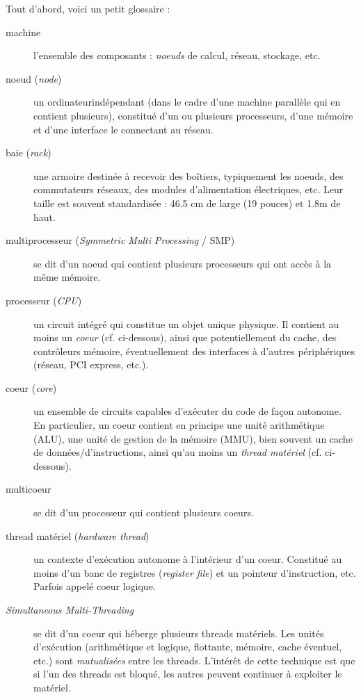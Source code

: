 Tout d'abord, voici un petit glossaire :
\begin{description}
\item[machine] l'ensemble des composants : \emph{noeuds} de calcul, réseau,
  stockage, etc.
  
\item[noeud (\textit{node})] un \og ordinateur\fg indépendant (dans le cadre
  d'une machine parallèle qui en contient plusieurs), constitué d'un ou
  plusieurs processeurs, d'une mémoire et d'une interface le connectant au
  réseau.

\item[baie (\textit{rack})] une armoire destinée à recevoir des boîtiers,
  typiquement les noeuds, des commutateurs réseaux, des modules d'alimentation
  électriques, etc. Leur taille est souvent standardisée : 46.5 cm de large (19
  pouces) et 1.8m de haut.

\item[multiprocesseur (\textit{Symmetric Multi Processing} / SMP)] se dit d'un
  noeud qui contient plusieurs processeurs qui ont accès à la même mémoire.

\item[processeur (\textit{CPU})] un circuit intégré qui constitue un objet
  unique physique. Il contient au moins un \emph{coeur} (cf. ci-dessous), ainsi
  que potentiellement du cache, des contrôleurs mémoire, éventuellement des
  interfaces à d'autres périphériques (réseau, PCI express, etc.).
  
\item[coeur (\textit{core})] un ensemble de circuits capables d'exécuter du code
  de façon autonome. En particulier, un coeur contient en principe une unité
  arithmétique (ALU), une unité de gestion de la mémoire (MMU), bien souvent un
  cache de données/d'instructions, ainsi qu'au moins un \emph{thread matériel}
  (cf. ci-dessous).

\item[multicoeur] se dit d'un processeur qui contient plusieurs coeurs.
  
\item[thread matériel (\textit{hardware thread})] un contexte d'exécution
  autonome à l'intérieur d'un coeur. Constitué au moins d'un banc de registres
  (\textit{register file}) et un pointeur d'instruction, etc. Parfois appelé \og
  coeur logique\fg.

\item[\textit{Simultaneous Multi-Threading}] se dit d'un coeur qui héberge
  plusieurs threads matériels. Les unités d'exécution (arithmétique et logique,
  flottante, mémoire, cache éventuel, etc.) sont \emph{mutualisées} entre les
  threads. L'intérêt de cette technique est que si l'un des threads est bloqué,
  les autres peuvent continuer à exploiter le matériel.
\end{description}

